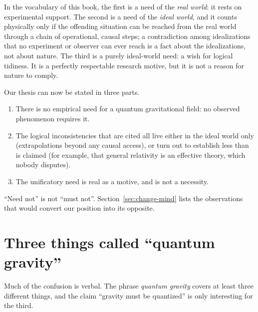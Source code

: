 In the vocabulary of this book, the first is a need of the \emph{real
world}: it rests on experimental support. The second is a need of the
\emph{ideal world}, and it counts physically only if the offending
situation can be reached from the real world through a chain of
operational, causal steps; a contradiction among idealizations
that no experiment or observer can ever reach is a fact about the
idealizations, not about nature. The third is a purely ideal-world
need: a wish for logical tidiness. It is a perfectly respectable
research motive, but it is not a reason for nature to comply.

Our thesis can now be stated in three parts.

\begin{enumerate}
\item There is no empirical need for a quantum gravitational field: no
  observed phenomenon requires it.
\item The logical inconsistencies that are cited all live either in the
  ideal world only (extrapolations beyond any causal access), or turn out
  to establish less than is claimed (for example, that general relativity
  is an effective theory, which nobody disputes).
\item The unificatory need is real as a motive, and is not a necessity.
\end{enumerate}

``Need not'' is not ``must not''. Section~\ref{sec:change-mind} lists the
observations that would convert our position into its opposite.

\section{Three things called ``quantum gravity''}

Much of the confusion is verbal. The phrase \emph{quantum gravity}
covers at least three different things, and the claim ``gravity must be
quantized'' is only interesting for the third.

